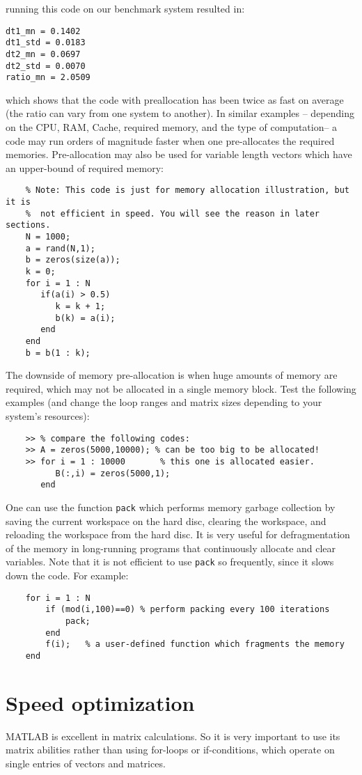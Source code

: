 \documentclass[10pt,a4paper]{article}
\newcounter{example}[section]
\begin{document}
running this code on our benchmark system resulted in:
\begin{lstlisting}
dt1_mn = 0.1402
dt1_std = 0.0183
dt2_mn = 0.0697
dt2_std = 0.0070
ratio_mn = 2.0509
\end{lstlisting}
which shows that the code with preallocation has been twice as fast on average (the ratio can vary from one system to another). In similar examples -- depending on the CPU, RAM, Cache, required memory, and the type of computation-- a code may run orders of magnitude faster when one pre-allocates the required memories. Pre-allocation may also be used for variable length vectors which have an upper-bound of required memory:
\begin{lstlisting}
	% Note: This code is just for memory allocation illustration, but it is
	%  not efficient in speed. You will see the reason in later sections.
	N = 1000;
	a = rand(N,1);
	b = zeros(size(a));
	k = 0;
	for i = 1 : N
	   if(a(i) > 0.5)
	      k = k + 1;
	      b(k) = a(i);
	   end
	end
	b = b(1 : k);
\end{lstlisting}
The downside of memory pre-allocation is when huge amounts of memory are required, which may not be allocated in a single memory block. Test the following examples (and change the loop ranges and matrix sizes depending to your system's resources):
\begin{lstlisting}
	>> % compare the following codes:
	>> A = zeros(5000,10000); % can be too big to be allocated!
	>> for i = 1 : 10000       % this one is allocated easier.
	      B(:,i) = zeros(5000,1);
	   end
\end{lstlisting}
One can use the function \texttt{pack} which performs memory garbage collection by saving the current workspace on the hard disc, clearing the workspace, and reloading the workspace from the hard disc. It is very useful for defragmentation of the memory in long-running programs that continuously allocate and clear variables. Note that it is not efficient to use \texttt{pack} so frequently, since it slows down the code. For example:
\begin{lstlisting}
	for i = 1 : N
		if (mod(i,100)==0) % perform packing every 100 iterations
			pack;
		end
		f(i);	% a user-defined function which fragments the memory
	end
\end{lstlisting}
\section{Speed optimization}
\label{sec:speed}
MATLAB is excellent in matrix calculations. So it is very important to use its matrix abilities rather than using for-loops or if-conditions, which operate on single entries of vectors and matrices.
\end{document}
